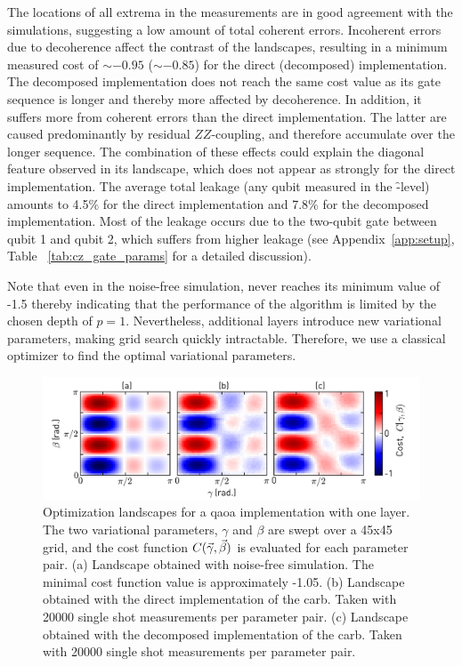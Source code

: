 The locations of all extrema in the measurements are in good agreement with the simulations, suggesting a low amount of total coherent errors. Incoherent errors due to decoherence affect the contrast of the landscapes, resulting in a minimum measured cost of $\sim -0.95$ ($\sim -0.85$) for the direct (decomposed) implementation. The decomposed implementation does not reach the same cost value as its gate sequence is longer and thereby more affected by decoherence. In addition, it suffers more from coherent errors than the direct implementation. The latter are caused predominantly by residual $ZZ$-coupling, and therefore accumulate over the longer sequence. The combination of these effects could explain the diagonal feature observed in its landscape, which does not appear as strongly for the direct implementation. The average total leakage (any qubit measured in the \f-level) amounts to 4.5\% for the direct implementation and 7.8\% for the decomposed implementation. Most of the leakage occurs due to the two-qubit gate between qubit 1 and qubit 2, which suffers from higher leakage (see Appendix~\ref{app:setup}, Table~ \ref{tab:cz_gate_params} for a detailed discussion).

Note that even in the noise-free simulation, \cost{} never reaches its minimum value of -1.5 thereby indicating that the performance of the algorithm is limited by the chosen depth of $p=1$. Nevertheless, additional layers introduce new variational parameters, making grid search quickly intractable. Therefore, we use a classical optimizer to find the optimal variational parameters.

\begin{figure}[ht]
    \centering
    \includegraphics[width=\textwidth]{chapters/qaoa/figs/qaoa_landscapes_20200216_211657.pdf}
    \caption{Optimization landscapes for a \gls{qaoa} implementation with one layer. The two variational parameters, $\gamma$ and $\beta$ are swept over a 45x45 grid, and the cost function $C(\vec\gamma, \vec\beta)$ is evaluated for each parameter pair.  (a) Landscape obtained with noise-free simulation. The minimal cost function value is approximately -1.05. (b) Landscape obtained with the direct implementation of the \gls{carb}. Taken with 20000 single shot measurements per parameter pair. (c) Landscape obtained with the decomposed implementation of the \gls{carb}. Taken with 20000 single shot measurements per parameter pair. }
    \label{fig:qaoa_landscapes}
\end{figure}


